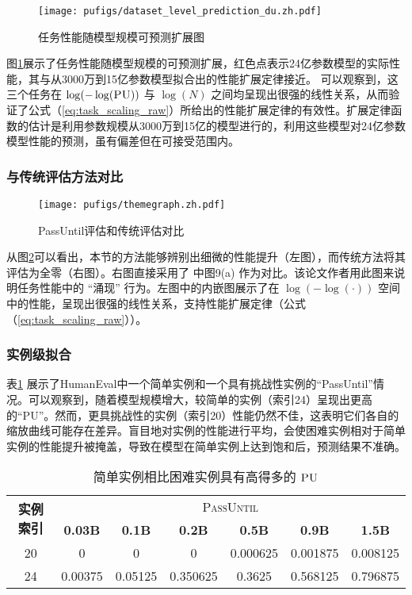 \begin{figure}[!htbp]
        \centering
        \texttt{[image: pufigs/dataset\_level\_prediction\_du.zh.pdf]}
        \caption{任务性能随模型规模可预测扩展图}
    \label{fig:dpu}
\end{figure}

图\ref{fig:dpu}展示了任务性能随模型规模的可预测扩展，{\color[rgb]{0.85,0.25,0.25}红色}点表示24亿参数模型的实际性能，其与从3000万到15亿参数模型拟合出的性能扩展定律接近。 可以观察到，这三个任务在 $\log(-\log(\textsc{PU}))$ 与 $\log(N)$ 之间均呈现出很强的线性关系，从而验证了公式（\ref{eq:task_scaling_raw}）所给出的性能扩展定律的有效性。扩展定律函数的估计是利用参数规模从3000万到15亿的模型进行的，利用这些模型对24亿参数模型性能的预测，虽有偏差但在可接受范围内。

\subsubsection{与传统评估方法对比}
\begin{figure}[!htbp]
    \centering
    \texttt{[image: pufigs/themegraph.zh.pdf]}
\caption{PassUntil评估和传统评估对比}
\label{fig:themefig}
\end{figure}

从图\ref{fig:themefig}可以看出，本节的方法能够辨别出细微的性能提升（左图），而传统方法将其评估为全零（右图）。右图直接采用了 \citet{sorscher2022beyond} 中图9(a) 作为对比。该论文作者用此图来说明任务性能中的 “涌现” 行为。左图中的内嵌图展示了在 $\log(-\log(\cdot))$ 空间中的性能，呈现出很强的线性关系，支持性能扩展定律（公式（\ref{eq:task_scaling_raw}））。



\subsubsection{实例级拟合}

表\ref{tab:easyhardinstances} 展示了HumanEval中一个简单实例和一个具有挑战性实例的“PassUntil”情况。可以观察到，随着模型规模增大，较简单的实例（索引24）呈现出更高的“PU”。然而，更具挑战性的实例（索引20）性能仍然不佳，这表明它们各自的缩放曲线可能存在差异。盲目地对实例的性能进行平均，会使困难实例相对于简单实例的性能提升被掩盖，导致在模型在简单实例上达到饱和后，预测结果不准确。

\begin{table}[h]
    \centering
    \caption{简单实例相比困难实例具有高得多的 $\textsc{PU}$}
    \begin{tabular}{c|cccccc}
    \toprule
        \multirow{2}{*}{\textbf{实例索引}}  & \multicolumn{6}{c}{\textsc{PassUntil}}   \\
        \cline{2 - 7}
        & \textbf{0.03B} & \textbf{0.1B} & \textbf{0.2B} & \textbf{0.5B} & \textbf{0.9B} & \textbf{1.5B} \\
        \midrule
        20 & 0 & 0 & 0 & 0.000625 & 0.001875 & 0.008125 \\
        24 & 0.00375 & 0.05125 & 0.350625 & 0.3625 & 0.568125 & 0.796875 \\
         \bottomrule
    \end{tabular}
    \label{tab:easyhardinstances}
\end{table}

